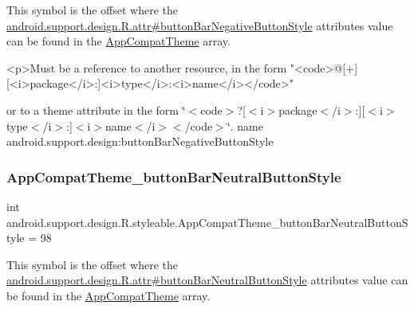 This symbol is the offset where the \hyperlink{classandroid_1_1support_1_1design_1_1R_1_1attr_abeb21f0b19ac0953b2c1e22f89ab62bc}{android.\+support.\+design.\+R.\+attr\#button\+Bar\+Negative\+Button\+Style} attribute\textquotesingle{}s value can be found in the \hyperlink{classandroid_1_1support_1_1design_1_1R_1_1styleable_afb351dc8de20cbd4c89abe360373010c}{App\+Compat\+Theme} array.

\begin{DoxyVerb}      <p>Must be a reference to another resource, in the form "<code>@[+][<i>package</i>:]<i>type</i>:<i>name</i></code>"
\end{DoxyVerb}
 or to a theme attribute in the form \char`\"{}$<$code$>$?\mbox{[}$<$i$>$package$<$/i$>$\+:\mbox{]}\mbox{[}$<$i$>$type$<$/i$>$\+:\mbox{]}$<$i$>$name$<$/i$>$$<$/code$>$\char`\"{}.  name android.\+support.\+design\+:button\+Bar\+Negative\+Button\+Style \mbox{\label{classandroid_1_1support_1_1design_1_1R_1_1styleable_a4599da08b2e1afe7ea7a57322f4c6e3a}} 
\subsubsection{\texorpdfstring{App\+Compat\+Theme\+\_\+button\+Bar\+Neutral\+Button\+Style}{AppCompatTheme\_buttonBarNeutralButtonStyle}}
{\footnotesize\ttfamily int android.\+support.\+design.\+R.\+styleable.\+App\+Compat\+Theme\+\_\+button\+Bar\+Neutral\+Button\+Style = 98\hspace{0.3cm}{\ttfamily [static]}}

This symbol is the offset where the \hyperlink{classandroid_1_1support_1_1design_1_1R_1_1attr_a054db1c73ad10e31005b962d4ae8d094}{android.\+support.\+design.\+R.\+attr\#button\+Bar\+Neutral\+Button\+Style} attribute\textquotesingle{}s value can be found in the \hyperlink{classandroid_1_1support_1_1design_1_1R_1_1styleable_afb351dc8de20cbd4c89abe360373010c}{App\+Compat\+Theme} array.

